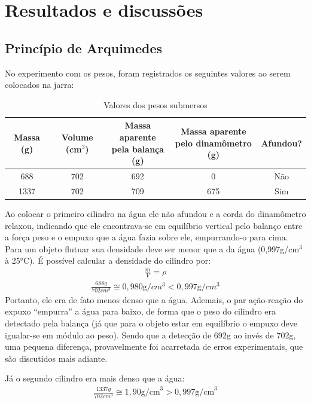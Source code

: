 \section{Resultados e discussões}
\subsection{Princípio de Arquimedes}

No experimento com os pesos, foram registrados os seguintes valores ao serem colocados na jarra:

\begin{table}[H]
    \centering
    \caption{Valores dos pesos submersos}
    \begin{tabular}{|c|c|c|c|c|}
        \hline
        Massa (g) & Volume (cm$^3$) & \makecell{Massa aparente \\ pela balança
        (g)} & \makecell{Massa aparente \\ pelo dinamômetro (g)} & Afundou? \\ \hline
        688 & 702 & 692 & 0 & Não \\ \hline
        1337 & 702 & 709 & 675 & Sim \\ \hline
    \end{tabular}
\end{table}

Ao colocar o primeiro cilindro na água ele não afundou e a corda do dinamômetro relaxou, indicando que ele encontrava-se em equilíbrio vertical pelo balanço entre a força peso e o empuxo que a água fazia sobre ele, empurrando-o para cima. Para um objeto flutuar sua densidade deve ser menor que a da água (0,997g/cm\(^3\) à 25°C). É possível calcular a densidade do cilindro por:
\begin{align*}
    \frac{m} {V} = \rho
\end{align*}
\begin{align*}
    \frac{688g}{702cm^3} \cong 0,980 \mbox{g/}cm^3 < 0,997\mbox{g/}cm^3
\end{align*}
Portanto, ele era de fato menos denso que a água. Ademais, o par ação-reação do
expuxo ``empurra'' a água para baixo, de forma que o peso do cilindro era detectado pela balança (já que para o objeto estar em equilíbrio o empuxo deve igualar-se em módulo ao peso). Sendo que a detecção de 692g ao invés de 702g, uma pequena diferença, provavelmente foi acarretada de erros experimentais, que são discutidos mais adiante.

Já o segundo cilindro era mais denso que a água:
\begin{align*}
    \frac{1337g}{702cm^3} \cong 1,90 \mbox{g/cm}^3 > 0,997\mbox{g/cm}^3
\end{align*}
    
